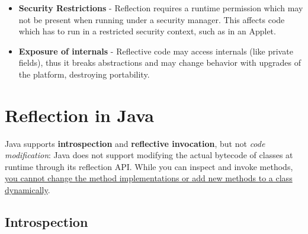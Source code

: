 \begin{itemize}
{\begin{itemize}
        \end{itemize}
    }
    \item \textbf{Security Restrictions} - Reflection requires a runtime permission which may not be present when
    running under a security manager. This affects code which has to run in a
    restricted security context, such as in an Applet.
    \item \textbf{Exposure of internals} - Reflective code may access internals (like private fields), thus it breaks
    abstractions and may change behavior with upgrades of the platform,
    destroying portability.
\end{itemize}
\newpage

\section{Reflection in Java}
Java supports \textbf{introspection} and \textbf{reflective invocation}, but not \textit{code modification}:
Java does not support modifying the actual bytecode of classes at runtime through its reflection API. While you can inspect and invoke methods, \ul{you cannot change the method implementations or add new methods to a class dynamically}.

\subsection{Introspection}


